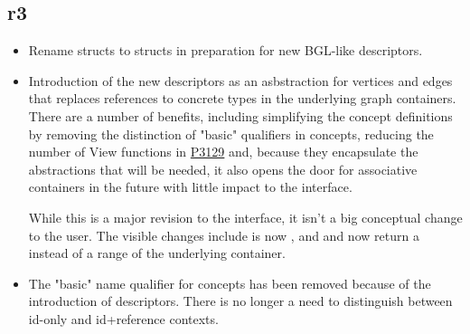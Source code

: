 \subsection*{\paperno r3}

\begin{itemize}
      \item Rename  structs to  structs in preparation for new BGL-like descriptors.
      \item Introduction of the new descriptors as an asbstraction for vertices and edges that replaces references
            to concrete types in the underlying graph containers. There are a number of benefits, including 
            simplifying the concept definitions by removing the distinction of "basic" qualifiers in concepts,
            reducing the number of View functions in \href{https://www.wg21.link/P3129}{P3129} and, because they 
            encapsulate the abstractions that will be needed, it also opens the door for associative containers 
            in the future with little impact to the interface. 
            
            While this is a major revision to the interface, it isn't a big conceptual change to the user. The visible
            changes include  is now , and  and 
            now return a  instead of a range of the underlying container.
      \item The "basic" name qualifier for concepts has been removed because of the introduction of descriptors.
            There is no longer a need to distinguish between id-only and id+reference contexts.
\end{itemize}
